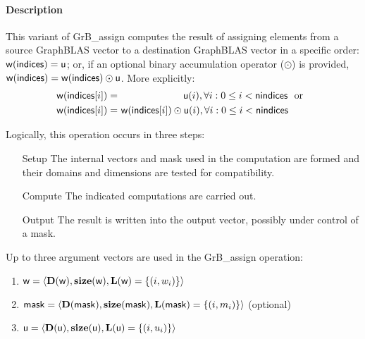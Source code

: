\paragraph{Description}

This variant of {\sf GrB\_assign} computes the result of assigning elements from 
a source GraphBLAS vector to a destination GraphBLAS vector in a specific order: 
${\sf w}({\sf indices}) = {\sf u}$; or, if an optional binary accumulation 
operator ($\odot$) is provided, 
${\sf w}({\sf indices}) = {\sf w}({\sf indices}) \odot {\sf u}$.  
More explicitly:
\[
\begin{aligned}
	{\sf w}({\sf indices}[i]) = &\ \ \ \ \ \ \ \ \ \ \ \ \ \ \ \ \ \ \ \ {\sf u}(i),
    \forall i : 0 \leq i < {\sf nindices} \mbox{~~or~~} \\
    {\sf w}({\sf indices}[i]) = &\ {\sf w}({\sf indices}[i]) \odot {\sf u}(i),
    \forall i : 0 \leq i < {\sf nindices}
\end{aligned}
\]  

Logically, this operation occurs in three steps:
\begin{enumerate}[leftmargin=0.75in]
\item[Setup] The internal vectors and mask used in the computation are formed 
and their domains and dimensions are tested for compatibility.
\item[Compute] The indicated computations are carried out.
\item[Output] The result is written into the output vector, possibly under 
control of a mask.
\end{enumerate}

Up to three argument vectors are used in the {\sf GrB\_assign} operation:
\begin{enumerate}
	\item ${\sf w} = \langle \bold{D}({\sf w}),\bold{size}({\sf w}),
    \bold{L}({\sf w}) = \{(i,w_i) \} \rangle$
    
	\item ${\sf mask} = \langle \bold{D}({\sf mask}),\bold{size}({\sf mask}),
    \bold{L}({\sf mask}) = \{(i,m_i) \} \rangle$ (optional)
    
	\item ${\sf u} = \langle \bold{D}({\sf u}),\bold{size}({\sf u}),
    \bold{L}({\sf u}) = \{(i,u_i) \} \rangle$
\end{enumerate}

